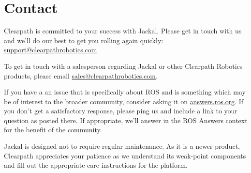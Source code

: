 \documentclass[]{clearpath-latex/clearpath-manual}
\begin{document}
\section{Contact}\label{trouble}\label{contact}

Clearpath is committed to your success with Jackal. Please get in touch with us and we'll
do our best to get you rolling again quickly: \href{mailto:support@clearpathrobotics.com}{support@clearpathrobotics.com}

To get in touch with a salesperson regarding Jackal or other Clearpath Robotics products, please
email \href{mailto:sales@clearpathrobotics.com}{sales@clearpathrobotics.com}.

If you have a an issue that is specifically about ROS and is something which may be of interest
to the broader community, consider asking it on \href{http://answers.ros.org}{answers.ros.org}.
If you don't get a satisfactory response, please ping us and include a link to your question
as posted there. If appropriate, we'll answer in the ROS Answers context for the benefit of the
community.

Jackal is designed not to require regular maintenance. As it is a newer product, Clearpath
appreciates your patience as we understand its weak-point components and fill out the appropriate
care instructions for the platform.
\end{document}
